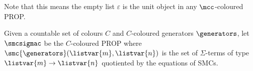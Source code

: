 Note that this means the empty list \(\varepsilon\) is the unit
object in any \(\mcc\)-coloured PROP.

\begin{definition}\label{def:freely-generated-coloured-prop}
    Given a countable set of colours \(C\) and \(C\)-coloured generators
    \(\generators\), let \(\smcsigmac\) be the \(C\)-coloured PROP where
    \(\smc{\generators}(\listvar{m}, \listvar{n})\) is the set of
    \(\Sigma\)-terms of type \(\listvar{m} \to \listvar{n}\) quotiented by
    the equations of SMCs.
\end{definition}
